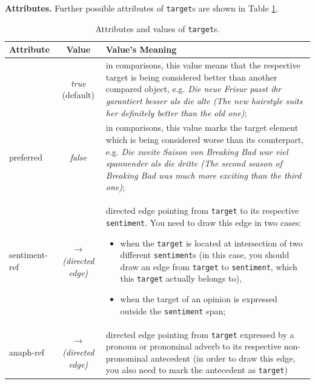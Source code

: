 \noindent\textbf{Attributes.} Further possible attributes of \texttt{target}s
are shown in Table \ref{tbl:target}.
\begin{center}
  \begin{table}[h]
    \caption{Attributes and values of \texttt{target}s.}
    \begin{tabular}{|l|c|p{0.94\clmnwidth}|}\hline
      Attribute & Value & Value's Meaning\\\hline

      & \textit{true} (default) & in comparisons, this value means that
      the respective target is being considered better than another
      compared object, e.g. \textit{\emph{Die neue Frisur} passt ihr
        garantiert besser als die alte (\emph{The new hairstyle} suits
        her definitely better than the old one)};\\\cline{2-3}

      \multirow{-2}{*}{preferred} & \textit{false} & in comparisons,
      this value marks the target element which is being considered
      worse than its counterpart, e.g. \textit{Die zweite Saison von
        Breaking Bad war viel spannender als \emph{die dritte} (The
        second season of Breaking Bad was much more exciting than
        \emph{the third one})};\\\hline

      sentiment-ref & \textit{$\longrightarrow$\newline(directed
        edge)} & directed edge pointing from \texttt{target} to its
      respective \texttt{sentiment}.  You need to draw this edge in
      two cases:
      \begin{itemize}
      \item when the \texttt{target} is located at intersection of two
        different \texttt{sentiment}s (in this case, you should draw
        an edge from \texttt{target} to \texttt{sentiment}, which this
        \texttt{target} actually belongs to),

      \item when the target of an opinion is expressed outside the
        \texttt{sentiment} span;
      \end{itemize}\\\hline

      anaph-ref & \textit{$\longrightarrow$\newline(directed edge)} &
      directed edge pointing from \texttt{target} expressed by a
      pronoun or pronominal adverb to its respective non-pronominal
      antecedent (in order to draw this edge, you also need to mark
      the antecedent as \texttt{target})\\\hline
    \end{tabular}
    \label{tbl:target}
  \end{table}
\end{center}

